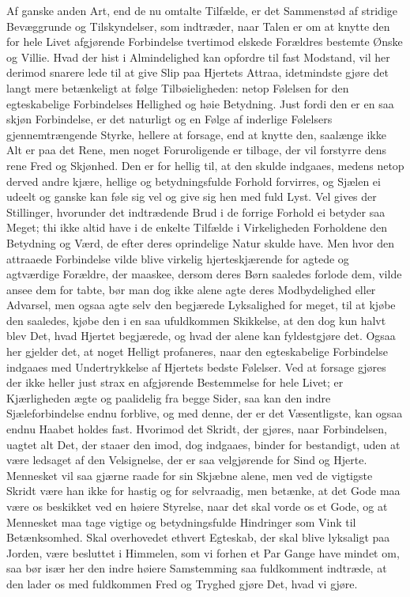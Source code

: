 \documentclass[12pt,a4paper]{book}
\newcommand{\apage}[1]{\marginnote{\footnotesize\textit{[#1]}}}
\begin{document}
Af ganske anden Art, end de nu omtalte Tilfælde, er det Sammenstød af
stridige Bevæggrunde og \apage{155} Tilskyndelser, som indtræder, naar Talen er om at
knytte den for hele Livet afgjørende Forbindelse tvertimod elskede
Forældres bestemte Ønske og Villie. Hvad der hist i Almindelighed kan
opfordre til fast Modstand, vil her derimod snarere lede til at give Slip
paa Hjertets Attraa, idetmindste gjøre det langt mere betænkeligt at
følge Tilbøieligheden: netop Følelsen for den egteskabelige Forbindelses
Hellighed og høie Betydning. Just fordi den er en saa skjøn Forbindelse,
er det naturligt og en Følge af inderlige Følelsers gjennemtrængende
Styrke, hellere at forsage, end at knytte den, saalænge ikke Alt er paa
det Rene, men noget Foruroligende er tilbage, der vil forstyrre dens rene
Fred og Skjønhed. Den er for hellig til, at den skulde indgaaes, medens
netop derved andre kjære, hellige og betydningsfulde Forhold forvirres,
og Sjælen ei udeelt og ganske kan føle sig vel og give sig hen med fuld
Lyst. Vel gives der Stillinger, hvorunder det indtrædende Brud i de
forrige Forhold ei betyder saa Meget; thi ikke altid have i de enkelte
Tilfælde i Virkeligheden Forholdene den Betydning og Værd, de efter deres
oprindelige Natur skulde have. Men hvor den attraaede Forbindelse vilde
blive virkelig hjerteskjærende for agtede og agtværdige Forældre, der
maaskee, dersom deres Børn saaledes forlode dem, vilde ansee dem for
tabte, bør man dog ikke alene agte deres Modbydelighed eller Advarsel,
men ogsaa agte selv den begjærede Lyksalighed for meget, til at kjøbe den \apage{156}
saaledes, kjøbe den i en saa ufuldkommen Skikkelse, at den dog kun halvt
blev Det, hvad Hjertet begjærede, og hvad der alene kan fyldestgjøre det.
Ogsaa her gjelder det, at noget Helligt profaneres, naar den
egteskabelige Forbindelse indgaaes med Undertrykkelse af Hjertets bedste
Følelser. Ved at forsage gjøres der ikke heller just strax en afgjørende
Bestemmelse for hele Livet; er Kjærligheden ægte og paalidelig fra begge
Sider, saa kan den indre Sjæleforbindelse endnu forblive, og med denne,
der er det Væsentligste, kan ogsaa endnu Haabet holdes fast. Hvorimod det
Skridt, der gjøres, naar Forbindelsen, uagtet alt Det, der staaer den
imod, dog indgaaes, binder for bestandigt, uden at være ledsaget af den
Velsignelse, der er saa velgjørende for Sind og Hjerte. Mennesket vil saa
gjærne raade for sin Skjæbne alene, men ved de vigtigste Skridt være han
ikke for hastig og for selvraadig, men betænke, at det Gode maa være os
beskikket ved en høiere Styrelse, naar det skal vorde os et Gode, og at
Mennesket maa tage vigtige og betydningsfulde Hindringer som Vink til
Betænksomhed. Skal overhovedet ethvert Egteskab, der skal blive lyksaligt
paa Jorden, være besluttet i Himmelen, som vi forhen et Par Gange have
mindet om, saa bør især her den indre høiere Samstemming saa fuldkomment
indtræde, at den lader os med fuldkommen Fred og Tryghed gjøre Det, hvad
vi gjøre.
\end{document}
